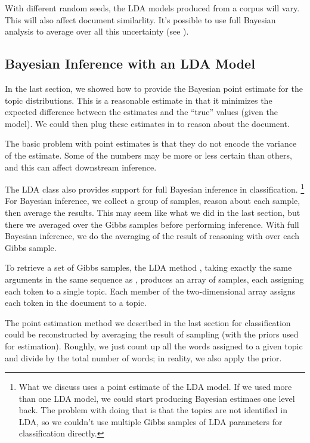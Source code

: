 With different random seeds, the LDA models produced from a corpus
will vary.  This will also affect document similarlity.  It's possible
to use full Bayesian analysis to average over all this uncertainty
(see ).



\subsection{Bayesian Inference with an LDA Model}\label{section:lda-bayesian-inference}

In the last section, we showed how to provide the Bayesian point
estimate for the topic distributions.  This is a reasonable estimate
in that it minimizes the expected difference between the estimates and
the ``true'' values (given the model).  We could then plug these
estimates in to reason about the document.  

The basic problem with point estimates is that they do not encode
the variance of the estimate.  Some of the numbers may be more or
less certain than others, and this can affect downstream inference.

The LDA class also provides support for full Bayesian inference
in classification.%
%
\footnote{What we discuss uses a point estimate of the LDA model.
If we used more than one LDA model, we could start producing
Bayesian estimaes one level back.  The problem with doing that is
that the topics are not identified in LDA, so we couldn't use multiple
Gibbs samples of LDA parameters for classification directly.}
%
For Bayesian inference, we collect a group of samples, reason
about each sample, then average the results.  This may seem like
what we did in the last section, but there we averaged over the
Gibbs samples before performing inference.  With full Bayesian
inference, we do the averaging of the result of reasoning with
over each Gibbs sample.

To retrieve a set of Gibbs samples, the LDA method
, taking exactly the same arguments in the same
sequence as , produces an array of samples,
each assigning each token to a single topic.  Each member of the
two-dimensional array assigns each token in the document to
a topic.

The point estimation method we described in the last section for
classification could be reconstructed by averaging the result of
sampling (with the priors used for estimation).  Roughly, we just count
up all the words assigned to a given topic and divide by the total
number of words; in reality, we also apply the prior.



